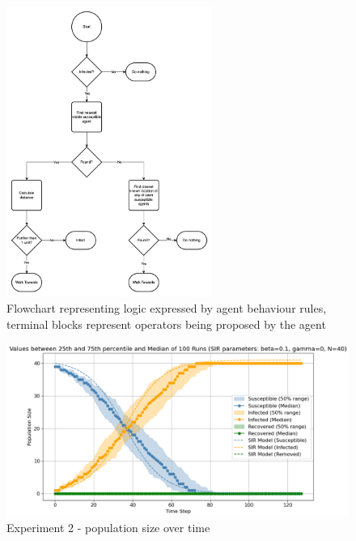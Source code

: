 \begin{figure}[H]
    \centering
    \includegraphics[width=0.6\textwidth]{images/chapter2/sir_logic2.drawio.png}
    \caption{Flowchart representing logic expressed by agent behaviour rules, terminal blocks represent operators being proposed by the agent}\label{fig:sir_logic2.drawio.png}
\end{figure}



\begin{figure}[H]
    \centering
    \includegraphics[width=1.0\textwidth]{images/chapter2/experiment2.png}
    \caption{Experiment 2 - population size over time}\label{fig:images/chapter2/experiment2.png}
\end{figure}

